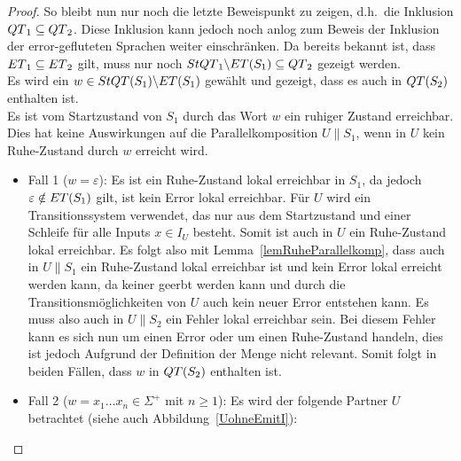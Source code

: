 \begin{proof}
  So bleibt nun nur noch die letzte Beweispunkt zu zeigen, d.h.\ die Inklusion
  $QT{}_1\subseteq QT{}_2$. Diese Inklusion kann jedoch noch anlog zum Beweis
  der Inklusion der error-gefluteten Sprachen weiter einschränken.
  Da bereits bekannt ist, dass $ET{}_1\subseteq ET{}_2$ gilt, muss nur
  noch $StQT{}_1\backslash ET{}(S_1)\subseteq QT{}_2$ gezeigt werden.\\
  Es wird ein $w\in StQT{}(S_1)\backslash ET{}(S_1)$ gewählt und gezeigt, dass
  es auch in $QT{}(S_2)$ enthalten ist.\\
  Es ist vom Startzustand von $S_1$ durch das Wort $w$ ein ruhiger Zustand
  erreichbar. Dies hat keine Auswirkungen auf die Parallelkomposition $U\|S_1$,
  wenn in $U$ kein Ruhe-Zustand durch $w$ erreicht wird.
  \begin{itemize}
    \item Fall 1 ($w=\varepsilon$): Es ist ein Ruhe-Zustand lokal erreichbar in
      $S_1$, da jedoch $\varepsilon\notin ET{}(S_1)$ gilt, ist kein Error
      lokal erreichbar. Für $U$ wird ein Transitionssystem verwendet, das nur
      aus dem Startzustand und einer Schleife für alle Inputs $x\in I_U$
      besteht. Somit ist auch in $U$ ein Ruhe-Zustand lokal erreichbar. Es
      folgt also mit Lemma~\ref{lemRuheParallelkomp}, dass auch in $U\|S_1$ ein
      Ruhe-Zustand lokal erreichbar ist und kein Error lokal erreicht werden
      kann, da keiner geerbt werden kann und durch die Transitionsmöglichkeiten
      von $U$ auch kein neuer Error entstehen kann. Es muss also auch in
      $U\|S_2$ ein Fehler lokal erreichbar sein. Bei diesem Fehler kann es sich
      nun um einen Error oder um einen Ruhe-Zustand handeln, dies ist jedoch
      Aufgrund der Definition der Menge \QT{} nicht relevant. Somit folgt in
      beiden Fällen, dass $w$ in $QT{}(S_2)$ enthalten ist.
    \item Fall 2 ($w=x_1\dots x_n\in \Sigma ^+$ mit $n\geq 1$): Es wird der
      folgende Partner $U$ betrachtet (siehe auch Abbildung~\ref{UohneEmitI}):
\end{itemize}
\end{proof}
